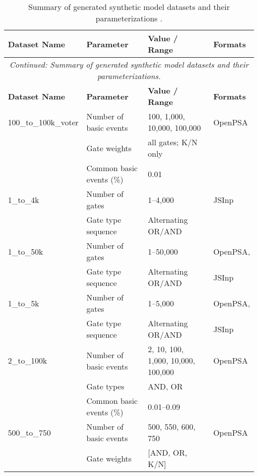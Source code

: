\begin{longtable}{@{}llll@{}}
\caption{Summary of generated synthetic model datasets and their parameterizations \cite{aras_synthetic_2025}.}
\label{tab:syn_datasets_overview}\\
\toprule
\textbf{Dataset Name} & \textbf{Parameter} & \textbf{Value / Range} & \textbf{Formats} \\* \midrule
\endfirsthead
\multicolumn{4}{c}{\textit{Continued: Summary of generated synthetic model datasets and their parameterizations.}}\\
\toprule
\textbf{Dataset Name} & \textbf{Parameter} & \textbf{Value / Range} & \textbf{Formats} \\* \midrule
\endhead
%
\bottomrule
\endfoot
%
\endlastfoot

100\_to\_100k\_voter & Number of basic events & 100, 1,000, 10,000, 100,000 & OpenPSA \\
                     & Gate weights          & all gates; K/N only          &               \\
                     & Common basic events (\%) & 0.01                      &               \\
\midrule
1\_to\_4k & Number of gates   & 1--4,000                     & JSInp \\
                         & Gate type sequence & Alternating OR/AND           &                 \\
\midrule
1\_to\_50k           & Number of gates       & 1--50,000                     & OpenPSA,\\
                     & Gate type sequence    & Alternating OR/AND            & JSInp   \\
\midrule
1\_to\_5k            & Number of gates       & 1--5,000                      & OpenPSA,\\
                     & Gate type sequence    & Alternating OR/AND            & JSInp   \\
\midrule
2\_to\_100k          & Number of basic events & 2, 10, 100, 1,000, 10,000, 100,000 & OpenPSA \\
                     & Gate types            & AND, OR                       &                 \\
                     & Common basic events (\%) & 0.01--0.09                 &                 \\
\midrule
500\_to\_750         & Number of basic events & 500, 550, 600, 750            & OpenPSA \\
                     & Gate weights           & [AND, OR, K/N]                &          \\

\end{longtable}
